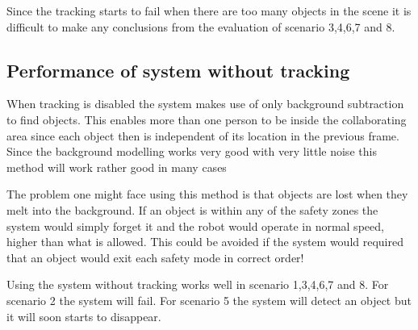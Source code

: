 Since the tracking starts to fail when there are too many objects in the scene it is difficult to make any conclusions from the evaluation of scenario 3,4,6,7 and 8.

\subsection{Performance of system without tracking}
When tracking is disabled the system makes use of only background subtraction to find objects.
This enables more than one person to be inside the collaborating area since each object then is independent of its location in the previous frame. Since the background modelling works very good with very little noise this method will work rather good in many cases

The problem one might face using this method is that objects are lost when they melt into the background.
If an object is within any of the safety zones the system would simply forget it and the robot would operate in normal speed, higher than what is allowed.
This could be avoided if the system would required that an object would exit each safety mode in correct order!

Using the system without tracking works well in scenario 1,3,4,6,7 and 8. For scenario 2 the system will fail. For scenario 5 the system will detect an object but it will soon starts to disappear.